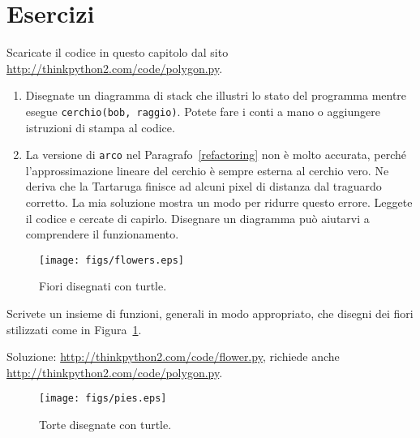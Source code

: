 \documentclass[10pt]{book}
\begin{document}
\section{Esercizi}

\begin{exercise}

Scaricate il codice in questo capitolo dal sito
\url{http://thinkpython2.com/code/polygon.py}.

\begin{enumerate}

\item Disegnate un diagramma di stack che illustri lo stato del programma mentre esegue {\tt cerchio(bob, raggio)}. Potete fare i conti a mano o aggiungere istruzioni di stampa al codice.

\item La versione di {\tt arco} nel Paragrafo~\ref{refactoring} non è molto accurata, perché l'approssimazione lineare del cerchio è sempre esterna al cerchio vero. Ne deriva che la Tartaruga finisce ad alcuni pixel di distanza dal traguardo corretto. La mia soluzione mostra un modo per ridurre questo errore. Leggete il codice e cercate di capirlo. Disegnare un diagramma può aiutarvi a comprendere il funzionamento.

\end{enumerate}

\end{exercise}

\begin{figure}
\centerline
{\texttt{[image: figs/flowers.eps]}}
\caption{Fiori disegnati con turtle.}
\label{fig.flowers}
\end{figure}

\vspace{0.2in}
\begin{exercise}

Scrivete un insieme di funzioni, generali in modo appropriato, che disegni dei fiori stilizzati come in Figura~\ref{fig.flowers}.

Soluzione: \url{http://thinkpython2.com/code/flower.py},
richiede anche \url{http://thinkpython2.com/code/polygon.py}.

\end{exercise}

\begin{figure}
\centerline
{\texttt{[image: figs/pies.eps]}}
\caption{Torte disegnate con turtle.}
\label{fig.pies}
\end{figure}
\end{document}
